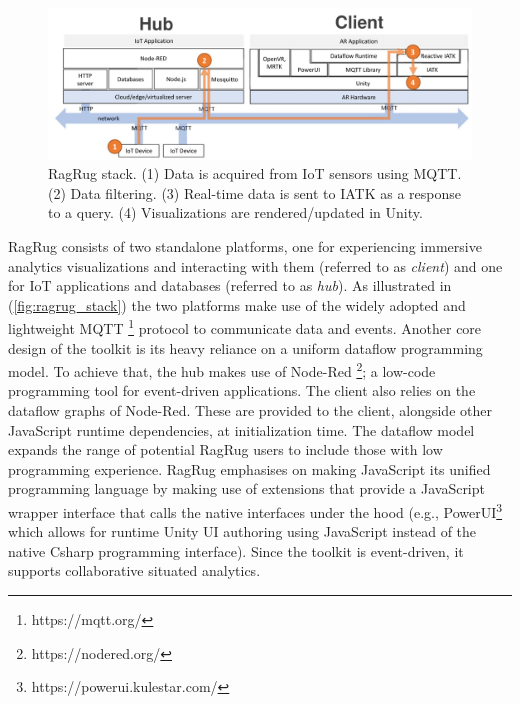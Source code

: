 \documentclass{vgtc}                          %
\begin{document}
\begin{figure}[tb]
	\centering
	\includegraphics[width=\columnwidth]{ragrug_stack}
	\caption[Caption for RagRug]{RagRug stack. (1) Data is acquired from IoT
		sensors using MQTT. (2) Data filtering. (3) Real-time data is sent to
		IATK as a response to a query. (4) Visualizations are
		rendered/updated in Unity.}
	\label{fig:ragrug_stack}
\end{figure}

\medskip

\noindent RagRug consists of two standalone platforms, one for experiencing immersive analytics
visualizations and interacting with them (referred to as \textit{client}) and one for IoT applications and
databases (referred to as \textit{hub}). As illustrated in (\autoref{fig:ragrug_stack}) the two
platforms make use of the widely adopted and lightweight MQTT \footnote{https://mqtt.org/} protocol to
communicate data and events. Another core design of the toolkit is its heavy reliance on a uniform
dataflow programming model. To achieve that, the hub makes use of Node-Red \footnote{https://nodered.org/};
a low-code programming tool for event-driven applications. The client also relies on the dataflow graphs of
Node-Red. These are provided to the client, alongside other JavaScript runtime dependencies, at
initialization time. The dataflow model expands the range of potential RagRug users to include those with
low programming experience. RagRug emphasises on making JavaScript its unified programming language by making
use of extensions that provide a JavaScript wrapper interface that calls the native interfaces under the hood
(e.g., PowerUI\footnote{https://powerui.kulestar.com/} which allows for runtime Unity UI authoring using
JavaScript instead of the native Csharp programming interface). Since the toolkit is event-driven, it
supports collaborative situated analytics.


\medskip
\end{document}
